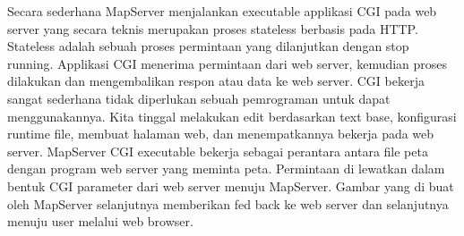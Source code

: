 Secara sederhana MapServer menjalankan executable applikasi CGI pada web server yang secara teknis merupakan 
proses stateless berbasis pada HTTP. Stateless adalah sebuah proses permintaan yang dilanjutkan dengan stop running. 
Applikasi CGI menerima permintaan dari web server, kemudian proses dilakukan dan mengembalikan respon atau data ke web server.
CGI bekerja sangat sederhana tidak diperlukan sebuah pemrograman untuk dapat menggunakannya. 
Kita tinggal melakukan edit berdasarkan text base, konfigurasi runtime file, membuat halaman web, 
dan menempatkannya bekerja pada web server. MapServer CGI executable bekerja sebagai perantara antara file peta 
dengan program web server yang meminta peta. Permintaan di lewatkan dalam bentuk CGI parameter dari web server menuju MapServer.
Gambar yang di buat oleh MapServer selanjutnya memberikan fed back ke web server dan selanjutnya menuju 
user melalui web browser.
